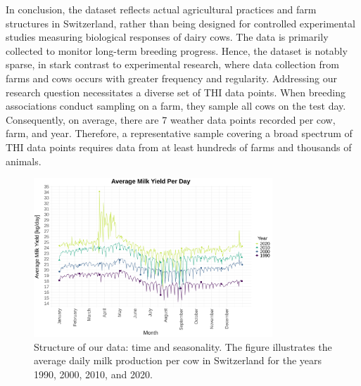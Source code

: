 \vspace*{\baselineskip}
In conclusion, the dataset reflects actual agricultural practices and farm structures in Switzerland, rather than being designed for controlled experimental studies measuring biological responses of dairy cows. The data is primarily collected to monitor long-term breeding progress. Hence, the dataset is notably sparse, in stark contrast to experimental research, where data collection from farms and cows occurs with greater frequency and regularity. Addressing our research question necessitates a diverse set of THI data points. When breeding associations conduct sampling on a farm, they sample all cows on the test day. Consequently, on average, there are 7 weather data points recorded per cow, farm, and year. Therefore, a representative sample covering a broad spectrum of THI data points requires data from at least hundreds of farms and thousands of animals.

\begin{figure}[H]
\centering
\includegraphics[width=0.8\textwidth]{thesis/figures/dataset/dataset_structure_3.png}
\caption{Structure of our data: time and seasonality. The figure illustrates the average daily milk production per cow in Switzerland for the years 1990, 2000, 2010, and 2020.}
\label{fig:dataset_structure_time_seasonality}
\end{figure}

